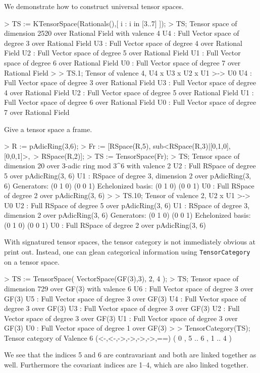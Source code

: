 \begin{example}
We demonstrate how to construct universal tensor spaces.

\begin{code}
> TS := KTensorSpace(Rationals(),[ i : i in [3..7] ]);
> TS;
Tensor space of dimension 2520 over Rational Field with 
valence 4
U4 : Full Vector space of degree 3 over Rational Field
U3 : Full Vector space of degree 4 over Rational Field
U2 : Full Vector space of degree 5 over Rational Field
U1 : Full Vector space of degree 6 over Rational Field
U0 : Full Vector space of degree 7 over Rational Field
> 
> TS.1;
Tensor of valence 4, U4 x U3 x U2 x U1 >-> U0
U4 : Full Vector space of degree 3 over Rational Field
U3 : Full Vector space of degree 4 over Rational Field
U2 : Full Vector space of degree 5 over Rational Field
U1 : Full Vector space of degree 6 over Rational Field
U0 : Full Vector space of degree 7 over Rational Field
\end{code}

Give a tensor space a frame.

\begin{code}
> R := pAdicRing(3,6);
> Fr := [RSpace(R,5), sub<RSpace(R,3)|[0,1,0],[0,0,1]>,\
>   RSpace(R,2)];
> TS := TensorSpace(Fr);
> TS;
Tensor space of dimension 20 over 3-adic ring mod 3^6 with 
valence 2
U2 : Full RSpace of degree 5 over pAdicRing(3, 6)
U1 : RSpace of degree 3, dimension 2 over pAdicRing(3, 6)
Generators:
(0 1 0)
(0 0 1)
Echelonized basis:
(0 1 0)
(0 0 1)
U0 : Full RSpace of degree 2 over pAdicRing(3, 6)
> 
> TS.10;
Tensor of valence 2, U2 x U1 >-> U0
U2 : Full RSpace of degree 5 over pAdicRing(3, 6)
U1 : RSpace of degree 3, dimension 2 over pAdicRing(3, 6)
Generators:
(0 1 0)
(0 0 1)
Echelonized basis:
(0 1 0)
(0 0 1)
U0 : Full RSpace of degree 2 over pAdicRing(3, 6)
\end{code}

With signatured tensor spaces, the tensor category is not immediately obvious at print out. 
Instead, one can glean categorical information using {\tt TensorCategory} on a tensor space.

\begin{code}
> TS := TensorSpace( VectorSpace(GF(3),3), 2, 4 );
> TS;
Tensor space of dimension 729 over GF(3) with valence 6
U6 : Full Vector space of degree 3 over GF(3)
U5 : Full Vector space of degree 3 over GF(3)
U4 : Full Vector space of degree 3 over GF(3)
U3 : Full Vector space of degree 3 over GF(3)
U2 : Full Vector space of degree 3 over GF(3)
U1 : Full Vector space of degree 3 over GF(3)
U0 : Full Vector space of degree 1 over GF(3)
> 
> TensorCategory(TS);
Tensor category of Valence 6 (<-,<-,->,->,->,->,==)
({ 0 },{ 5 .. 6 },{ 1 .. 4 })
\end{code}

We see that the indices 5 and 6 are contravariant and both are linked together as well. Furthermore the covariant indices are 1--4, which are also linked together.
\end{example}

